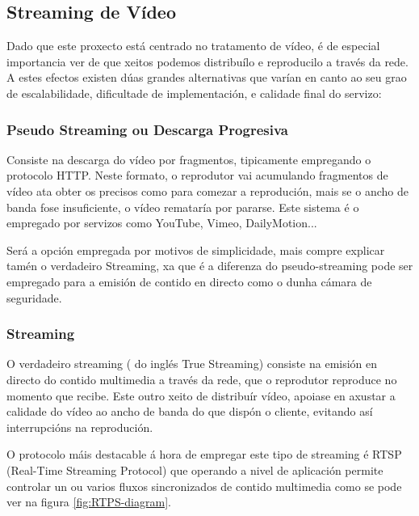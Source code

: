     \subsection{Streaming de Vídeo}
        Dado que este proxecto está centrado no tratamento de vídeo, é de especial importancia ver 
        de que xeitos podemos distribuílo e reproducilo a través da rede. A estes efectos existen dúas
        grandes alternativas que varían en canto ao seu grao de escalabilidade, dificultade de 
        implementación, e calidade final do servizo:
        
        \subsubsection{Pseudo Streaming ou Descarga Progresiva}
            Consiste na descarga do vídeo por fragmentos, tipicamente empregando o protocolo HTTP. 
            Neste formato, o reprodutor vai acumulando fragmentos de vídeo ata obter os precisos como 
            para comezar a reprodución, mais se o ancho de banda fose insuficiente, o vídeo remataría
            por pararse. Este sistema é o empregado por servizos como YouTube, Vimeo, DailyMotion...
            
            Será a opción empregada por motivos de simplicidade, mais compre explicar tamén o verdadeiro 
            Streaming, xa que é a diferenza do pseudo-streaming pode ser empregado para a emisión de
            contido en directo como o dunha cámara de seguridade.
            
        \subsubsection{Streaming}
        \label{sec:streaming}
            O verdadeiro streaming ( do inglés True Streaming) consiste na emisión en directo do 
            contido multimedia a través da rede, que o reprodutor reproduce no momento que recibe.
            Este outro xeito de distribuír vídeo, apoiase en axustar a calidade do vídeo ao ancho de
            banda do que dispón o cliente, evitando así interrupcións na reprodución.
            
            O protocolo máis destacable á hora de empregar este tipo de streaming é RTSP (Real-Time
            Streaming Protocol) que operando a nivel de aplicación permite controlar un ou varios fluxos 
            sincronizados de contido multimedia como se pode ver na figura \ref{fig:RTPS-diagram}.
            
